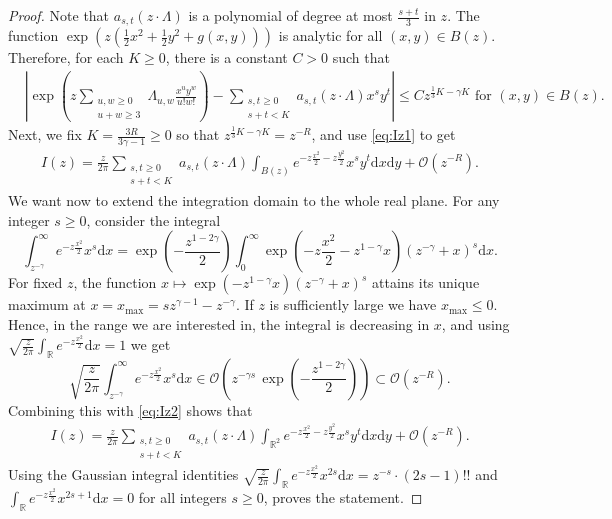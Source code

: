 \documentclass[english]{ourlematemasingle}
\numberwithin{theorem}{section}
\theoremstyle{remark}
\newcommand{\R}{\mathbb{R}}
\newcommand{\ol}{\Lambda}
\newcommand{\bigO}{\mathcal{O}}
\renewcommand{\d}{\mathrm{d}}
\begin{document}
\begin{proof}
Note that $a_{s,t}(z \cdot \ol)$ is a polynomial of degree at most $\frac{s+t}{3}$ in $z$. The function $\exp(z (\frac{1}{2}x^2+\frac{1}{2}y^2+g(x,y)))$ is analytic for all $(x,y) \in B(z)$. Therefore, for each $K \geq 0$, there is a constant $C> 0$ such that 
    \begin{align*}
        & \left\lvert  \exp\left(z \sum_{\substack{u,w \geq 0\\ u+w \geq 3}} \ol_{u,w} \frac{x^u y^w}{u!w!} \right) - \sum_{\substack{s,t \geq 0\\ s+t < K}} a_{s,t}(z \cdot \ol) x^{s} y^t \right\rvert
         \leq C z^{\frac{1}{3}K-\gamma K} \text{ for }  (x,y) \in B(z).
    \end{align*}
Next, we fix $K=\frac{3R}{3\gamma -1} \geq 0$ so that 
$z^{\frac{1}{3}K-\gamma K} = z^{-R}$, and use \eqref{eq:Iz1} to get
\begin{align}
\label{eq:Iz2}
    I(z) =  \frac{z}{2\pi} \sum_{\substack{s,t \geq 0\\ s+t < K}}  a_{s,t}(z \cdot \ol) 
\int_{B(z)} e^{-z\frac{x^2}{2} - z\frac{y^2}{2} }  
x^{s} y^t
\d x \d y  + \bigO(z^{-R}).
\end{align}
We want now to extend the integration domain to the whole real plane. For any integer $s \geq 0$, consider the integral
$$
\int_{z^{-\gamma}}^\infty e^{-z\frac{x^2}{2}}x^s \d x =
\exp\left({-\frac{z^{1-2\gamma}}{2}}\right)\int_{0}^\infty \exp\left({-z\frac{x^2}{2} -z^{1-\gamma} x}\right)(z^{-\gamma}+x)^s \d x.
$$
For fixed $z$, the function $x\mapsto \exp({-z^{1-\gamma} x})(z^{-\gamma}+x)^s$ attains its unique maximum at
$x=x_\mathrm{max} = sz^{\gamma-1} -z^{-\gamma}$. If $z$ is sufficiently large we have $x_\mathrm{max} \leq 0$. Hence, in the range we are interested in, the integral is decreasing in $x$, and using $\sqrt{\frac{z}{2\pi}}\int_\R e^{-z \frac{x^2}{2}} \d x = 1$ we get
$$
\sqrt{\frac{z}{2\pi}}
\int_{z^{-\gamma}}^\infty e^{-z\frac{x^2}{2}}x^s \d x 
\in \bigO\left( 
z^{-\gamma s}\,
\exp\left({-\frac{z^{1-2\gamma}}{2}}\right)
\right) \subset \bigO(z^{-R}).
$$
Combining this with \eqref{eq:Iz2} shows that 
\begin{align*}
    I(z) =  \frac{z}{2\pi} \sum_{\substack{s,t \geq 0\\ s+t < K}}  a_{s,t}(z \cdot \ol) 
\int_{\R^{2}} e^{-z\frac{x^2}{2} - z\frac{y^2}{2} }  
x^{s} y^t
\d x \d y  + \bigO(z^{-R}).
\end{align*}
Using the Gaussian integral identities $\sqrt{\frac{z}{2\pi}}\int_\R e^{-z \frac{x^2}{2}}x^{2s} \d x = z^{-s}\cdot (2s-1)!!$
and $\int_\R e^{-z \frac{x^2}{2}}x^{2s+1} \d x=0$ for all integers $s\geq 0$, proves the statement.
\end{proof}
\end{document}
